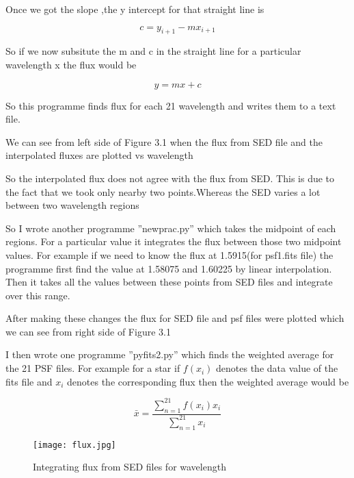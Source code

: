 Once we got the slope ,the y intercept for that straight line is

\begin{equation}
 c = y_{i+1} - mx_{i+1}
\end{equation}

So if we now  subsitute the m and c in the straight line for a particular wavelength x the flux would be

\begin{equation}
 y = mx +c
\end{equation}

So this programme finds flux for each 21 wavelength and writes them to a text file.

We can see from  left side of Figure 3.1 when the flux from SED file and the interpolated fluxes are plotted vs wavelength

So the interpolated flux does not agree with the flux from SED. This is due to the fact that we took only nearby two points.Whereas
the SED varies a lot between two wavelength regions

So I wrote another programme ''newprac.py'' which takes the midpoint of each regions. For a particular value it integrates the flux
between those two midpoint values. For example if we need to know the flux at 1.5915(for psf1.fits file) the programme first find the value
at 1.58075 and 1.60225 by linear interpolation. Then it takes all the values between these points from SED files and integrate
over this range.

After making these changes the flux for SED file and psf files were plotted which we can see from right side of
Figure 3.1


I then wrote one programme ''pyfits2.py'' which finds the weighted average for the 21 PSF files.
For example for a star if $f(x_i) $ denotes the data value of the fits file and $x_i $ denotes the corresponding flux then the
weighted average would be

\begin{equation}
  \bar x = \frac{\sum_{n=1}^{21} f(x_i)x_i}{\sum_{n=1}^{21} x_i}
\end{equation}

\begin{figure}[ht]
\begin{center}
\texttt{[image: flux.jpg]}
\label{fig}
\caption{Integrating flux from SED files for  wavelength}
\end{center}
\end{figure}


